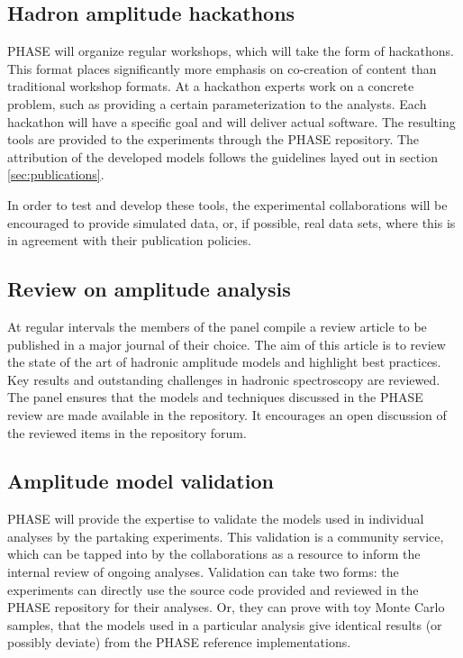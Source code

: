 \subsection{Hadron amplitude hackathons}
\label{sec:hackathon}
PHASE will organize regular workshops, which will take the form of hackathons. This format places significantly more emphasis on co-creation of content than traditional workshop formats. At a hackathon experts work on a concrete problem, such as providing a certain parameterization to the analysts. Each hackathon will have a specific goal and will deliver actual software. The resulting tools are provided to the experiments through the PHASE repository. The attribution of the developed models follows the guidelines layed out in section \ref{sec:publications}.

In order to test and develop these tools, the experimental collaborations will be encouraged to provide simulated data, or, if possible, real data sets, where this is in agreement with their publication policies.


\subsection{Review on amplitude analysis}
\label{rec:review}
At regular intervals the members of the panel compile a review article to be published in a major journal of their choice. The aim of this article is to review the state of the art of hadronic amplitude models and highlight best practices. Key results and outstanding challenges in hadronic spectroscopy are reviewed. The panel ensures that the models and techniques discussed in the PHASE review are made available in the repository. It encourages an open discussion of the reviewed items in the repository forum.

\subsection{Amplitude model validation}
\label{sec:validation}
PHASE will provide the expertise to validate the models used in individual analyses by the partaking experiments. This validation is a community service, which can be tapped into by the collaborations as a resource to inform the internal review of ongoing analyses. Validation can take two forms: the experiments can directly use the source code provided and reviewed in the PHASE repository for their analyses. Or, they can prove with toy Monte Carlo samples, that the models used in a particular analysis give identical results (or possibly deviate) from the PHASE reference implementations.

